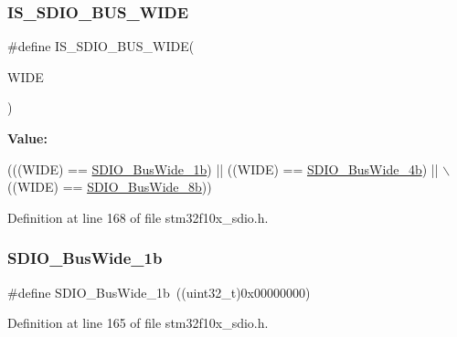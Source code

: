 \subsubsection{\texorpdfstring{I\+S\+\_\+\+S\+D\+I\+O\+\_\+\+B\+U\+S\+\_\+\+W\+I\+DE}{IS\_SDIO\_BUS\_WIDE}}
{\footnotesize\ttfamily \#define I\+S\+\_\+\+S\+D\+I\+O\+\_\+\+B\+U\+S\+\_\+\+W\+I\+DE(\begin{DoxyParamCaption}\item[{}]{W\+I\+DE }\end{DoxyParamCaption})}

{\bfseries Value\+:}
\begin{DoxyCode}
(((WIDE) == \hyperlink{group___s_d_i_o___bus___wide_ga9c333b57937c5cc0a173a58519f9250a}{SDIO\_BusWide\_1b}) || ((WIDE) == \hyperlink{group___s_d_i_o___bus___wide_ga79815d1d798b28a2d3750ad25466ff1b}{SDIO\_BusWide\_4b}) || \(\backslash\)
                                ((WIDE) == \hyperlink{group___s_d_i_o___bus___wide_ga4d864f5c4e1af298146afc1d680081e9}{SDIO\_BusWide\_8b}))
\end{DoxyCode}


Definition at line 168 of file stm32f10x\+\_\+sdio.\+h.

\mbox{\label{group___s_d_i_o___bus___wide_ga9c333b57937c5cc0a173a58519f9250a}} 
\subsubsection{\texorpdfstring{S\+D\+I\+O\+\_\+\+Bus\+Wide\+\_\+1b}{SDIO\_BusWide\_1b}}
{\footnotesize\ttfamily \#define S\+D\+I\+O\+\_\+\+Bus\+Wide\+\_\+1b~((uint32\+\_\+t)0x00000000)}



Definition at line 165 of file stm32f10x\+\_\+sdio.\+h.

\mbox{\label{group___s_d_i_o___bus___wide_ga79815d1d798b28a2d3750ad25466ff1b}} 
